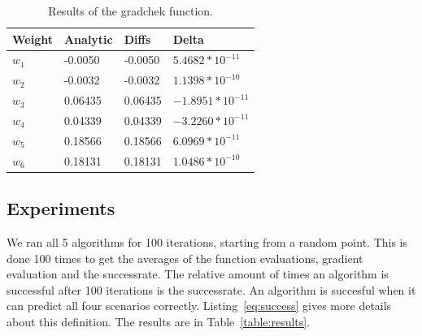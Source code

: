 \documentclass{article}
\begin{document}


	

\begin{table}[H]
	\centering
	\begin{tabular}{| l | l | l | l |}
		\hline
		Weight & Analytic & Diffs & Delta \\ \hline
$w_1$ & -0.0050 & -0.0050 & $5.4682*10^{-11}$ \\ \hline
$w_2$ & -0.0032 & -0.0032 & $1.1398*10^{-10}$ \\ \hline
$w_3$ & 0.06435 & 0.06435 & $-1.8951*10^{-11}$ \\ \hline
$w_4$ & 0.04339 & 0.04339 & $-3.2260*10^{-11}$ \\ \hline
$w_5$ & 0.18566 & 0.18566 & $6.0969*10^{-11}$ \\ \hline
$w_6$ & 0.18131 & 0.18131 & $1.0486*10^{-10}$ \\ \hline
	\end{tabular}
	\caption{Results of the gradchek function.}
	\label{table:gradchek}
\end{table}

\subsection{Experiments}
We ran all 5 algorithms for 100 iterations, starting from a random point. This is done 100 times to get the averages of the function evaluations, gradient evaluation and the successrate. The relative amount of times an algorithm is successful after 100 iterations is the successrate. An algorithm is succesful when it can predict all four scenarios correctly. Listing~\ref{eq:success} gives more details about this definition. The results are in Table~\ref{table:results}. 
\end{document}
